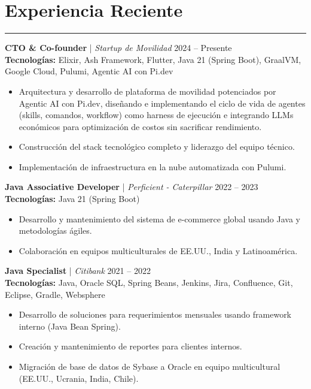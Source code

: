 \documentclass[11pt,a4paper]{article}
\begin{document}
\section*{Experiencia Reciente}
\hrule
\vspace{8pt}
\textbf{CTO \& Co-founder} | \textit{Startup de Movilidad} \hfill 2024 -- Presente \\
\textbf{Tecnologías:} Elixir, Ash Framework, Flutter, Java 21 (Spring Boot), GraalVM, Google Cloud, Pulumi, Agentic AI con Pi.dev \\
\begin{itemize}[noitemsep, topsep=0pt]
    \item Arquitectura y desarrollo de plataforma de movilidad potenciados por Agentic AI con Pi.dev, diseñando e implementando el ciclo de vida de agentes (skills, comandos, workflow) como harness de ejecución e integrando LLMs económicos para optimización de costos sin sacrificar rendimiento.
    \item Construcción del stack tecnológico completo y liderazgo del equipo técnico.
    \item Implementación de infraestructura en la nube automatizada con Pulumi.
\end{itemize}
\vspace{8pt}
\textbf{Java Associative Developer} | \textit{Perficient - Caterpillar} \hfill 2022 -- 2023 \\
\textbf{Tecnologías:} Java 21 (Spring Boot) \\
\begin{itemize}[noitemsep, topsep=0pt]
    \item Desarrollo y mantenimiento del sistema de e-commerce global usando Java y metodologías ágiles.
    \item Colaboración en equipos multiculturales de EE.UU., India y Latinoamérica.
\end{itemize}
\vspace{8pt}
\textbf{Java Specialist} | \textit{Citibank} \hfill 2021 -- 2022 \\
\textbf{Tecnologías:} Java, Oracle SQL, Spring Beans, Jenkins, Jira, Confluence, Git, Eclipse, Gradle, Websphere \\
\begin{itemize}[noitemsep, topsep=0pt]
    \item Desarrollo de soluciones para requerimientos mensuales usando framework interno (Java Bean Spring).
    \item Creación y mantenimiento de reportes para clientes internos.
    \item Migración de base de datos de Sybase a Oracle en equipo multicultural (EE.UU., Ucrania, India, Chile).
\end{itemize}
\end{document}
